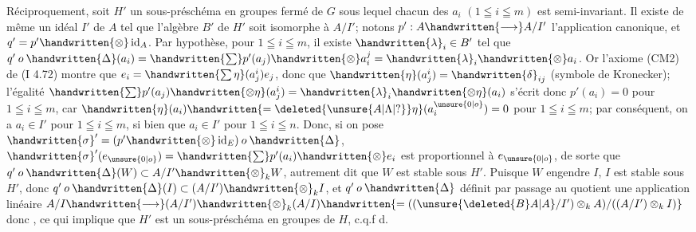 Réciproquement, soit $H'$ un sous-préschéma en groupes fermé de $G$ sous lequel chacun des $a_i$ $(1\leqq i\leqq m)$ est semi-invariant.  Il existe de même un idéal $I'$ de $A$ tel que l'algèbre $B'$ de $H'$ soit isomorphe à $A/I'$; notons $p':A\handwritten{\longrightarrow}A/I'$ l'application canonique, et $q'=p'\handwritten{\otimes}\operatorname{id}_A$. Par hypothèse, pour $1\leqq i\leqq m$, il existe $\handwritten{\lambda}_i\in B'$ tel que $q'\mathbin{o}\handwritten{\Delta}(a_i)=\handwritten{\sum}p'(a_j)\handwritten{\otimes}a_i^j=\handwritten{\lambda}_i\handwritten{\otimes}a_i$. Or l'axiome (CM2) de (I 4.72) montre que $e_i=\handwritten{\sum\eta}(a_j^i)e_j$, donc que $\handwritten{\eta}(a_j^i)=\handwritten{\delta}_{ij}$ (symbole de Kronecker); l'égalité $\handwritten{\sum}p'(a_j)\handwritten{\otimes\eta}(a_j^i)=\handwritten{\lambda}_i\handwritten{\otimes\eta}(a_i)$ s'écrit donc $p'(a_i)=0$ pour $1\leqq i\leqq m$, car $\handwritten{\eta}(a_i)\handwritten{=\deleted{\unsure{A|\Lambda|?}}\eta}(a_i^{\unsure{0|o}})=0$ pour $1\leqq i\leqq m$; par conséquent, on a $a_i\in I'$ pour $1\leqq i\leqq m$, si bien que $a_i\in I'$ pour $1\leqq i\leqq n$. Donc, si on pose $\handwritten{\sigma}'=(p'\handwritten{\otimes}\operatorname{id}_E)\mathbin{o}\handwritten{\Delta}$, $\handwritten{\sigma}'(e_{\unsure{0|o}})=\handwritten{\sum}p'(a_i)\handwritten{\otimes}e_i$ est proportionnel à $e_{\unsure{0|o}}$, de sorte que $q'\mathbin{o}\handwritten{\Delta}(W)\subset A/I'\handwritten{\otimes}_k W$, autrement dit que $W$ est stable sous $H'$. Puisque $W$ engendre $I$, $I$ est stable sous $H'$, donc $q'\mathbin{o}\handwritten{\Delta}(I)\subset(A/I')\handwritten{\otimes}_k I$, et $q'\mathbin{o}\handwritten{\Delta}$ définit par passage au quotient une application linéaire $A/I\handwritten{\longrightarrow}(A/I')\handwritten{\otimes}_k(A/I)\handwritten{=((\unsure{\deleted{B}A|A}/I')\otimes_k A)/((A/I')\otimes_k I)}$ donc , ce qui implique que $H'$ est  un sous-préschéma en groupes de $H$, c.q.f d.

